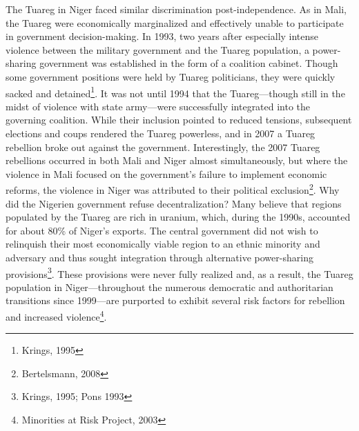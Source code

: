 \documentclass[12pt]{article}
\begin{document}
The Tuareg in Niger faced similar discrimination post-independence. As in Mali, the Tuareg were economically marginalized and effectively unable to participate in government decision-making. In 1993, two years after especially intense violence between the military government and the Tuareg population, a power-sharing government was established in the form of a coalition cabinet. Though some government positions were held by Tuareg politicians, they were quickly sacked and detained\footnote{Krings, 1995}. It was not until 1994 that the Tuareg---though still in the midst of violence with state army---were successfully integrated into the governing coalition. While their inclusion pointed to reduced tensions, subsequent elections and coups rendered the Tuareg powerless, and in 2007 a Tuareg rebellion broke out against the government. Interestingly, the 2007 Tuareg rebellions occurred in both Mali and Niger almost simultaneously, but where the violence in Mali focused on the government's failure to implement economic reforms, the violence in Niger was attributed to their political exclusion\footnote{Bertelsmann, 2008}. Why did the Nigerien government refuse decentralization? Many believe that regions populated by the Tuareg are rich in uranium, which, during the 1990s, accounted for about 80\% of Niger's exports. The central government did not wish to relinquish their most economically viable region to an ethnic minority and adversary and thus sought integration through alternative power-sharing provisions\footnote{Krings, 1995; Pons 1993}. These provisions were never fully realized and, as a result, the Tuareg population in Niger---throughout the numerous democratic and authoritarian transitions since 1999---are purported to exhibit several risk factors for rebellion and increased violence\footnote{Minorities at Risk Project, 2003}.
\end{document}
